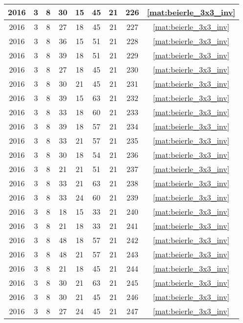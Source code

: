 \begin{longtable}{|c|c|c|c|c|c|c|c|c|}
2016 & 3 & 8 & 30 & 15 & 45 & 21 & 226 & \eqref{mat:beierle_3x3_inv} \\ \hline 
2016 & 3 & 8 & 27 & 18 & 45 & 21 & 227 & \eqref{mat:beierle_3x3_inv} \\ \hline 
2016 & 3 & 8 & 36 & 15 & 51 & 21 & 228 & \eqref{mat:beierle_3x3_inv} \\ \hline 
2016 & 3 & 8 & 39 & 18 & 51 & 21 & 229 & \eqref{mat:beierle_3x3_inv} \\ \hline 
2016 & 3 & 8 & 27 & 18 & 45 & 21 & 230 & \eqref{mat:beierle_3x3_inv} \\ \hline 
2016 & 3 & 8 & 30 & 21 & 45 & 21 & 231 & \eqref{mat:beierle_3x3_inv} \\ \hline 
2016 & 3 & 8 & 39 & 15 & 63 & 21 & 232 & \eqref{mat:beierle_3x3_inv} \\ \hline 
2016 & 3 & 8 & 33 & 18 & 60 & 21 & 233 & \eqref{mat:beierle_3x3_inv} \\ \hline 
2016 & 3 & 8 & 39 & 18 & 57 & 21 & 234 & \eqref{mat:beierle_3x3_inv} \\ \hline 
2016 & 3 & 8 & 33 & 21 & 57 & 21 & 235 & \eqref{mat:beierle_3x3_inv} \\ \hline 
2016 & 3 & 8 & 30 & 18 & 54 & 21 & 236 & \eqref{mat:beierle_3x3_inv} \\ \hline 
2016 & 3 & 8 & 21 & 21 & 51 & 21 & 237 & \eqref{mat:beierle_3x3_inv} \\ \hline 
2016 & 3 & 8 & 33 & 21 & 63 & 21 & 238 & \eqref{mat:beierle_3x3_inv} \\ \hline 
2016 & 3 & 8 & 33 & 24 & 60 & 21 & 239 & \eqref{mat:beierle_3x3_inv} \\ \hline 
2016 & 3 & 8 & 18 & 15 & 33 & 21 & 240 & \eqref{mat:beierle_3x3_inv} \\ \hline 
2016 & 3 & 8 & 21 & 18 & 33 & 21 & 241 & \eqref{mat:beierle_3x3_inv} \\ \hline 
2016 & 3 & 8 & 48 & 18 & 57 & 21 & 242 & \eqref{mat:beierle_3x3_inv} \\ \hline 
2016 & 3 & 8 & 48 & 21 & 57 & 21 & 243 & \eqref{mat:beierle_3x3_inv} \\ \hline 
2016 & 3 & 8 & 21 & 18 & 45 & 21 & 244 & \eqref{mat:beierle_3x3_inv} \\ \hline 
2016 & 3 & 8 & 30 & 21 & 63 & 21 & 245 & \eqref{mat:beierle_3x3_inv} \\ \hline 
2016 & 3 & 8 & 30 & 21 & 45 & 21 & 246 & \eqref{mat:beierle_3x3_inv} \\ \hline 
2016 & 3 & 8 & 27 & 24 & 45 & 21 & 247 & \eqref{mat:beierle_3x3_inv} \\ \hline 

\end{longtable}
